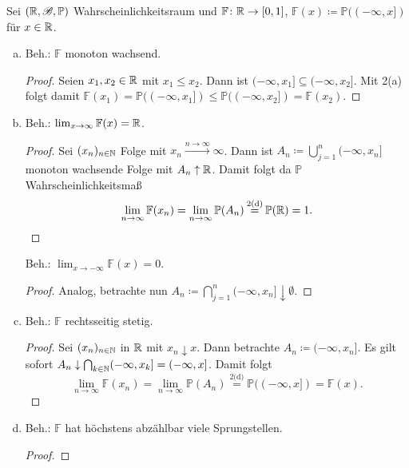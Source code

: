 \documentclass[uebung]{lecture}
\begin{document}
\begin{aufgabe}
    Sei $(\mathbb{R}, \mathscr{B}, \mathbb{P})$ Wahrscheinlichkeitsraum und
    $\mathbb{F}\colon \mathbb{R} \to [0,1]$, $\mathbb{F}(x) \coloneqq \mathbb{P} ((-\infty, x])$ für $x \in \mathbb{R}$.
    \begin{enumerate}[(a)]
        \item Beh.: $\mathbb{F}$ monoton wachsend.
            \begin{proof}
                Seien $x_1, x_2 \in \mathbb{R}$ mit $x_1 \le x_2$. Dann ist
                $(-\infty, x_1] \subseteq (-\infty, x_2]$. Mit 2(a) folgt damit
                $\mathbb{F}(x_1) = \mathbb{P}((-\infty, x_1]) \le \mathbb{P}((-\infty, x_2]) = \mathbb{F}(x_2)$.
            \end{proof}
        \item Beh.: $\lim_{x \to \infty} \mathbb{F}(x) = \mathbb{R}$.
            \begin{proof}
                Sei $(x_n)_{n \in \mathbb{N}}$ Folge mit $x_n \xrightarrow{n \to \infty} \infty$. Dann ist
                $A_n \coloneqq \bigcup_{j=1}^{n} (-\infty, x_n]$ monoton wachsende Folge
                mit $A_n \uparrow \mathbb{R}$. Damit folgt da $\mathbb{P}$ Wahrscheinlichkeitsmaß
                \[
                    \lim_{n \to \infty} \mathbb{F}(x_n) = \lim_{n \to \infty} \mathbb{P}(A_n)
                    \; \stackrel{\text{2(d)}}{=} \;\mathbb{P}(\R) = 1
                .\]
            \end{proof}
            Beh.: $\lim_{x \to -\infty} \mathbb{F}(x) = 0$.
            \begin{proof}
                Analog, betrachte nun $A_n \coloneqq \bigcap_{j=1}^{n} (-\infty, x_n] \downarrow \emptyset$.
            \end{proof}
        \item Beh.: $\mathbb{F}$ rechtsseitig stetig.
            \begin{proof}
                Sei $(x_n)_{n \in \mathbb{N}}$ in $\mathbb{R}$ mit $x_n \downarrow x$. Dann betrachte
                $A_n \coloneqq (-\infty, x_n]$. Es gilt sofort $A_n \downarrow
                \bigcap_{k \in \mathbb{N}} (-\infty, x_k] = (-\infty, x]$. Damit folgt
                \[
                    \lim_{n \to \infty} \mathbb{F}(x_n) = \lim_{n \to \infty} \mathbb{P}(A_n)
                    \stackrel{\text{2(d)}}{=} \mathbb{P}((-\infty, x]) = \mathbb{F}(x)
                .\]
            \end{proof}
        \item Beh.: $\mathbb{F}$ hat höchstens abzählbar viele Sprungstellen.
            \begin{proof}

\end{proof}
\end{enumerate}
\end{aufgabe}
\end{document}
